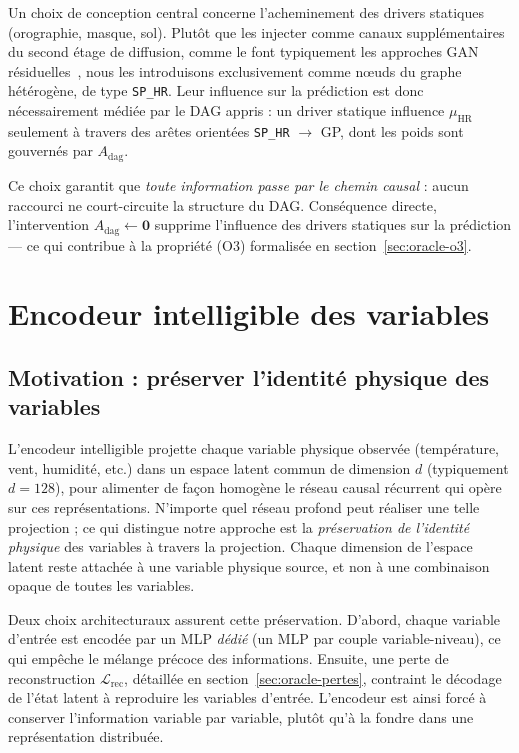 \documentclass[14pt,a4paper,openany]{extreport}
\theoremstyle{definition}
\newcommand{\HR}{\ensuremath{\text{HR}}}
\newcommand{\muHR}{\ensuremath{\mu_{\HR}}}
\newcommand{\Adag}{\ensuremath{A_{\mathrm{dag}}}}
\newcommand{\Lrec}{\ensuremath{\mathcal{L}_{\mathrm{rec}}}}
\begin{document}
Un choix de conception central concerne l'acheminement des drivers statiques (orographie, masque, sol). Plutôt que les injecter comme canaux supplémentaires du second étage de diffusion, comme le font typiquement les approches GAN résiduelles~\cite{rampal_cgan_2024}, nous les introduisons exclusivement comme nœuds du graphe hétérogène, de type \texttt{SP\_HR}. Leur influence sur la prédiction est donc nécessairement médiée par le DAG appris : un driver statique influence $\muHR$ seulement à travers des arêtes orientées \texttt{SP\_HR} $\to$ GP, dont les poids sont gouvernés par $\Adag$.

Ce choix garantit que \emph{toute information passe par le chemin causal} : aucun raccourci ne court-circuite la structure du DAG. Conséquence directe, l'intervention $\Adag \leftarrow \mathbf{0}$ supprime l'influence des drivers statiques sur la prédiction --- ce qui contribue à la propriété (O3) formalisée en section~\ref{sec:oracle-o3}.

\section{Encodeur intelligible des variables}
\label{sec:oracle-encoder}

\subsection{Motivation : préserver l'identité physique des variables}
\label{ssec:oracle-encoder-motivation}

L'encodeur intelligible projette chaque variable physique observée (température, vent, humidité, etc.) dans un espace latent commun de dimension $d$ (typiquement $d = 128$), pour alimenter de façon homogène le réseau causal récurrent qui opère sur ces représentations. N'importe quel réseau profond peut réaliser une telle projection ; ce qui distingue notre approche est la \emph{préservation de l'identité physique} des variables à travers la projection. Chaque dimension de l'espace latent reste attachée à une variable physique source, et non à une combinaison opaque de toutes les variables.

Deux choix architecturaux assurent cette préservation. D'abord, chaque variable d'entrée est encodée par un MLP \emph{dédié} (un MLP par couple variable-niveau), ce qui empêche le mélange précoce des informations. Ensuite, une perte de reconstruction $\Lrec$, détaillée en section~\ref{sec:oracle-pertes}, contraint le décodage de l'état latent à reproduire les variables d'entrée. L'encodeur est ainsi forcé à conserver l'information variable par variable, plutôt qu'à la fondre dans une représentation distribuée.
\end{document}
